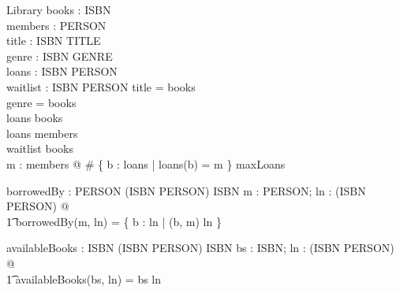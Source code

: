 \documentclass{article}
\begin{document}
\begin{schema}{Library}
  books : \power ISBN \\
  members : \power PERSON \\
  title : ISBN \pfun TITLE \\
  genre : ISBN \pfun GENRE \\
  loans : ISBN \pfun PERSON \\
  waitlist : ISBN \pfun \seq PERSON
\where
  \dom title = books \\
  \dom genre = books \\
  \dom loans \subseteq books \\
  \ran loans \subseteq members \\
  \dom waitlist \subseteq books \\
  \forall m : members @ \# \{ b : \dom loans | loans(b) = m \} \leq maxLoans
\end{schema}


\begin{axdef}
  borrowedBy : PERSON \cross \power (ISBN \cross PERSON) \fun \power ISBN
\where
  \forall m : PERSON; ln : \power (ISBN \cross PERSON) @ \\
    \t1 borrowedBy(m, ln) = \{ b : \dom ln | (b, m) \in ln \}
\end{axdef}

\begin{axdef}
  availableBooks : \power ISBN \cross \power (ISBN \cross PERSON) \fun \power ISBN
\where
  \forall bs : \power ISBN; ln : \power (ISBN \cross PERSON) @ \\
    \t1 availableBooks(bs, ln) = bs \setminus \dom ln
\end{axdef}
\end{document}
